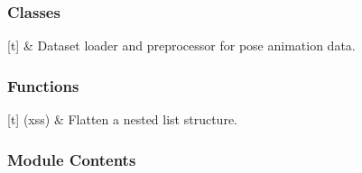 \documentclass[letterpaper,10pt,english]{sphinxmanual}
\begin{document}
\subsubsection{Classes}
\label{\detokenize{autoapi/src/DataLoader/index:classes}}

\begin{savenotes}\sphinxattablestart
\sphinxthistablewithglobalstyle
\sphinxthistablewithnovlinesstyle
\centering
\begin{tabulary}{\linewidth}[t]{}
\sphinxtoprule
\sphinxtableatstartofbodyhook
\sphinxAtStartPar
{\hyperref[\detokenize{autoapi/src/DataLoader/index:src.DataLoader.DataLoader}]{}}
&
\sphinxAtStartPar
Dataset loader and preprocessor for pose animation data.
\\
\sphinxbottomrule
\end{tabulary}
\sphinxtableafterendhook\par
\sphinxattableend\end{savenotes}


\subsubsection{Functions}
\label{\detokenize{autoapi/src/DataLoader/index:functions}}

\begin{savenotes}\sphinxattablestart
\sphinxthistablewithglobalstyle
\sphinxthistablewithnovlinesstyle
\centering
\begin{tabulary}{\linewidth}[t]{}
\sphinxtoprule
\sphinxtableatstartofbodyhook
\sphinxAtStartPar
{\hyperref[\detokenize{autoapi/src/DataLoader/index:src.DataLoader.flatten}]{}}(xss)
&
\sphinxAtStartPar
Flatten a nested list structure.
\\
\sphinxbottomrule
\end{tabulary}
\sphinxtableafterendhook\par
\sphinxattableend\end{savenotes}


\subsubsection{Module Contents}
\label{\detokenize{autoapi/src/DataLoader/index:module-contents}}
\end{document}
